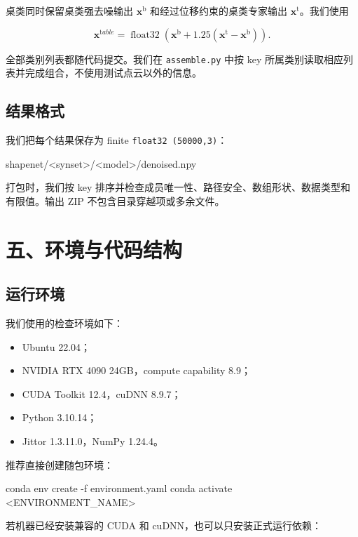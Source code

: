 \documentclass[UTF8,a4paper,11pt,fontset=fandol]{ctexart}
\newcommand{\code}[1]{\nolinkurl{#1}}
\begin{document}
桌类同时保留桌类强去噪输出 $\mathbf{x}^{\mathrm b}$ 和经过位移约束的桌类专家输出 $\mathbf{x}^{\mathrm t}$。我们使用

\[
\mathbf{x}^{\mathrm table}=\operatorname{float32}\!\left(
\mathbf{x}^{\mathrm b}+1.25(\mathbf{x}^{\mathrm t}-\mathbf{x}^{\mathrm b})
\right).
\]

全部类别列表都随代码提交。我们在 \code{assemble.py} 中按 key 所属类别读取相应列表并完成组合，不使用测试点云以外的信息。

\subsection{结果格式}

我们把每个结果保存为 finite \code{float32 (50000,3)}：

\begin{CodeBlock}
shapenet/<synset>/<model>/denoised.npy
\end{CodeBlock}

打包时，我们按 key 排序并检查成员唯一性、路径安全、数组形状、数据类型和有限值。输出 ZIP 不包含目录穿越项或多余文件。

\section{五、环境与代码结构}

\subsection{运行环境}

我们使用的检查环境如下：

\begin{itemize}
  \item Ubuntu 22.04；
  \item NVIDIA RTX 4090 24GB，compute capability 8.9；
  \item CUDA Toolkit 12.4，cuDNN 8.9.7；
  \item Python 3.10.14；
  \item Jittor 1.3.11.0，NumPy 1.24.4。
\end{itemize}

推荐直接创建随包环境：

\begin{CodeBlock}
conda env create -f environment.yaml
conda activate <ENVIRONMENT_NAME>
\end{CodeBlock}

若机器已经安装兼容的 CUDA 和 cuDNN，也可以只安装正式运行依赖：
\end{document}
